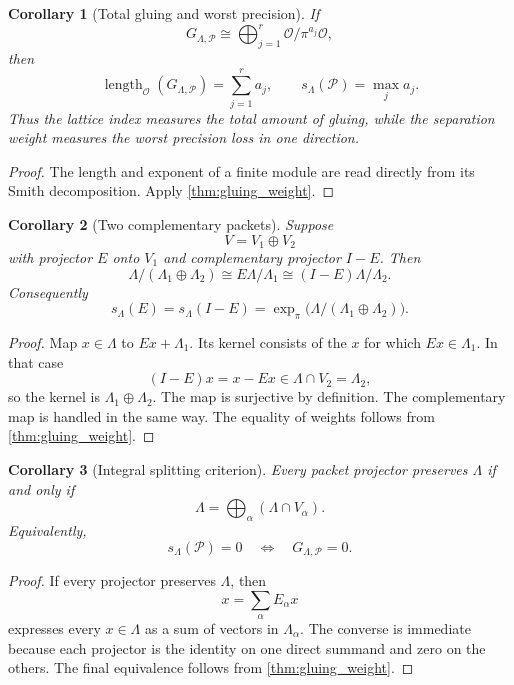 \documentclass{aomart}
\newtheorem{corollary}[corollary]{Corollary}
\theoremstyle{definition}
\theoremstyle{remark}
\newcommand{\OO}{\mathcal O}
\newcommand{\Pcal}{\mathcal P}
\newcommand{\length}{\operatorname{length}}
\newcommand{\expn}{\operatorname{exp}}
\begin{document}
\begin{corollary}[Total gluing and worst precision]\label{cor:length_and_weight}
If
\[
G_{\Lambda,\Pcal}
\cong
\bigoplus_{j=1}^r\OO/\pi^{a_j}\OO,
\]
then
\[
\length_{\OO}(G_{\Lambda,\Pcal})
=
\sum_{j=1}^ra_j,
\qquad
s_\Lambda(\Pcal)=\max_ja_j.
\]
Thus the lattice index measures the total amount of gluing, while the separation weight measures the worst precision loss in one direction.
\end{corollary}

\begin{proof}
The length and exponent of a finite module are read directly from its Smith decomposition.  Apply \cref{thm:gluing_weight}.
\end{proof}

\begin{corollary}[Two complementary packets]\label{cor:binary_gluing}
Suppose
\[
V=V_1\oplus V_2
\]
with projector $E$ onto $V_1$ and complementary projector $I-E$.  Then
\[
\Lambda/(\Lambda_1\oplus\Lambda_2)
\cong
E\Lambda/\Lambda_1
\cong
(I-E)\Lambda/\Lambda_2.
\]
Consequently
\[
s_\Lambda(E)=s_\Lambda(I-E)
=
\expn_\pi\bigl(\Lambda/(\Lambda_1\oplus\Lambda_2)\bigr).
\]
\end{corollary}

\begin{proof}
Map $x\in\Lambda$ to $Ex+\Lambda_1$.  Its kernel consists of the $x$ for which $Ex\in\Lambda_1$.  In that case
\[
(I-E)x=x-Ex\in\Lambda\cap V_2=\Lambda_2,
\]
so the kernel is $\Lambda_1\oplus\Lambda_2$.  The map is surjective by definition.  The complementary map is handled in the same way.  The equality of weights follows from \cref{thm:gluing_weight}.
\end{proof}

\begin{corollary}[Integral splitting criterion]\label{cor:integral_split}
Every packet projector preserves $\Lambda$ if and only if
\[
\Lambda=\bigoplus_\alpha(\Lambda\cap V_\alpha).
\]
Equivalently,
\[
s_\Lambda(\Pcal)=0
\quad\Longleftrightarrow\quad
G_{\Lambda,\Pcal}=0.
\]
\end{corollary}

\begin{proof}
If every projector preserves $\Lambda$, then
\[
x=\sum_\alpha E_\alpha x
\]
expresses every $x\in\Lambda$ as a sum of vectors in $\Lambda_\alpha$.  The converse is immediate because each projector is the identity on one direct summand and zero on the others.  The final equivalence follows from \cref{thm:gluing_weight}.
\end{proof}
\end{document}
